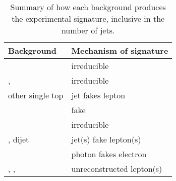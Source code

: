 \begin{table}[t]
	\begin{tabular}{l@{\hskip 0.3in}l}
		\toprule
		Background        & Mechanism of \HepProcess{\Plepton\Plepton + \met} signature \\
		\midrule
		\WW               & irreducible \\
		\ttbar, \HepProcess{\PW \Ptop} & irreducible \\
		other single top  & jet fakes lepton \\
		\DYll             & fake \met \\
		\DYtt             & irreducible \\
		\Wjets, dijet     & jet(s) fake lepton(s) \\
		\Wgamma           & photon fakes electron \\
		\WZ, \Wgstar, \ZZ & unreconstructed lepton(s) \\
		\bottomrule
	\end{tabular}
	\caption{Summary of how each background produces the 
	\HepProcess{\Plepton\Plepton + \met} experimental signature, inclusive in the number of 
	jets.}
	\label{tab:bkg_summary}
\end{table}
